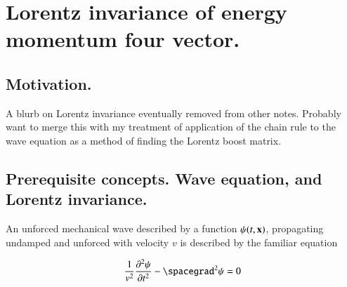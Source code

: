 
%
%
%



\chapter{Lorentz invariance of energy momentum four vector.}

%

\section{Motivation.}

A blurb on Lorentz invariance eventually removed from other notes.
Probably want to merge this with my treatment of application of the
chain rule to the wave equation as a method of
finding the Lorentz boost matrix.

\section{Prerequisite concepts.  Wave equation, and Lorentz invariance.}

An unforced mechanical wave described by a function $\psi(t,\mathbf{x})$, propagating undamped and unforced with
velocity $v$ is described by the familiar equation

\begin{align}\label{eqn:invarianceEnMom:waveEquationV}
\inv{v^2} \frac{\partial^2 \psi}{\partial t^2} - \spacegrad^2 \psi = 0
\end{align}


